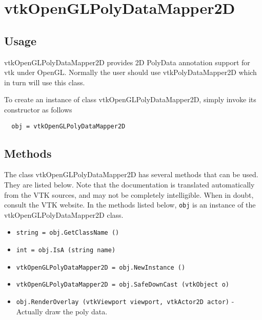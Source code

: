 \section{vtkOpenGLPolyDataMapper2D}

\subsection{Usage}

 vtkOpenGLPolyDataMapper2D provides 2D PolyData annotation support for 
 vtk under OpenGL.  Normally the user should use vtkPolyDataMapper2D 
 which in turn will use this class.

To create an instance of class vtkOpenGLPolyDataMapper2D, simply
invoke its constructor as follows
\begin{verbatim}
  obj = vtkOpenGLPolyDataMapper2D
\end{verbatim}
\subsection{Methods}

The class vtkOpenGLPolyDataMapper2D has several methods that can be used.
  They are listed below.
Note that the documentation is translated automatically from the VTK sources,
and may not be completely intelligible.  When in doubt, consult the VTK website.
In the methods listed below, \verb|obj| is an instance of the vtkOpenGLPolyDataMapper2D class.
\begin{itemize}
\item  \verb|string = obj.GetClassName ()|

\item  \verb|int = obj.IsA (string name)|

\item  \verb|vtkOpenGLPolyDataMapper2D = obj.NewInstance ()|

\item  \verb|vtkOpenGLPolyDataMapper2D = obj.SafeDownCast (vtkObject o)|

\item  \verb|obj.RenderOverlay (vtkViewport viewport, vtkActor2D actor)| -  Actually draw the poly data.

\end{itemize}
